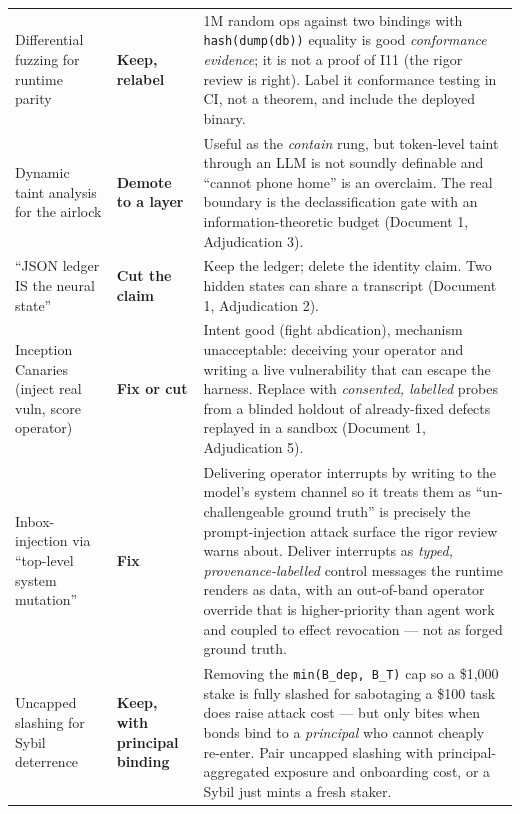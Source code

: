 \documentclass[11pt,a4paper]{article}
\begin{document}
\begin{longtable}{@{}p{}p{}p{}@{}}
\addlinespace
Differential fuzzing for runtime parity & \textbf{Keep, relabel} & 1M random ops against two bindings with \texttt{hash(dump(db))} equality is good \emph{conformance evidence}; it is not a proof of I11 (the rigor review is right). Label it conformance testing in CI, not a theorem, and include the deployed binary. \\
\addlinespace
Dynamic taint analysis for the airlock & \textbf{Demote to a layer} & Useful as the \emph{contain} rung, but token-level taint through an LLM is not soundly definable and ``cannot phone home'' is an overclaim. The real boundary is the declassification gate with an information-theoretic budget (Document 1, Adjudication 3). \\
\addlinespace
``JSON ledger IS the neural state'' & \textbf{Cut the claim} & Keep the ledger; delete the identity claim. Two hidden states can share a transcript (Document 1, Adjudication 2). \\
\addlinespace
Inception Canaries (inject real vuln, score operator) & \textbf{Fix or cut} & Intent good (fight abdication), mechanism unacceptable: deceiving your operator and writing a live vulnerability that can escape the harness. Replace with \emph{consented, labelled} probes from a blinded holdout of already-fixed defects replayed in a sandbox (Document 1, Adjudication 5). \\
\addlinespace
Inbox-injection via ``top-level system mutation'' & \textbf{Fix} & Delivering operator interrupts by writing to the model's system channel so it treats them as ``un-challengeable ground truth'' is precisely the prompt-injection attack surface the rigor review warns about. Deliver interrupts as \emph{typed, provenance-labelled} control messages the runtime renders as data, with an out-of-band operator override that is higher-priority than agent work and coupled to effect revocation --- not as forged ground truth. \\
\addlinespace
Uncapped slashing for Sybil deterrence & \textbf{Keep, with principal binding} & Removing the \texttt{min(B\_dep, B\_T)} cap so a \$1{,}000 stake is fully slashed for sabotaging a \$100 task does raise attack cost --- but only bites when bonds bind to a \emph{principal} who cannot cheaply re-enter. Pair uncapped slashing with principal-aggregated exposure and onboarding cost, or a Sybil just mints a fresh staker. \\
\bottomrule
\end{longtable}
\end{document}
